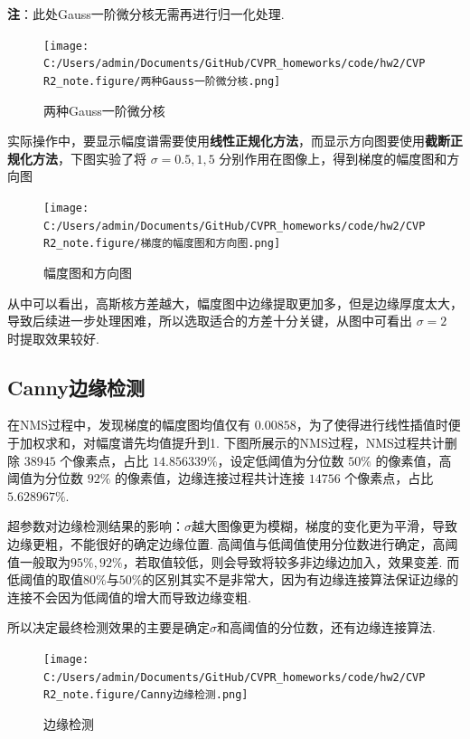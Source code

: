 \documentclass[12pt, a4paper, oneside]{ctexart}
\numberwithin{equation}{section}  %
\begin{document}
\textbf{注}：此处Gauss一阶微分核无需再进行归一化处理.

\begin{figure}[htbp]
    \centering
    \texttt{[image: C:/Users/admin/Documents/GitHub/CVPR\_homeworks/code/hw2/CVPR2\_note.figure/两种Gauss一阶微分核.png]}
    \caption{两种Gauss一阶微分核\label{fig-6}}
\end{figure}

实际操作中，要显示幅度谱需要使用\textbf{线性正规化方法}，而显示方向图要使用\textbf{截断正规化方法}，下图实验了将
\(\sigma=0.5, 1, 5\) 分别作用在图像上，得到梯度的幅度图和方向图

\begin{figure}[htbp]
    \centering
    \hspace*{-1.5cm}
    \texttt{[image: C:/Users/admin/Documents/GitHub/CVPR\_homeworks/code/hw2/CVPR2\_note.figure/梯度的幅度图和方向图.png]}
    \caption{幅度图和方向图\label{fig-7}}
\end{figure}

从中可以看出，高斯核方差越大，幅度图中边缘提取更加多，但是边缘厚度太大，导致后续进一步处理困难，所以选取适合的方差十分关键，从图中可看出
\(\sigma=2\) 时提取效果较好.

\subsection{Canny边缘检测}
在NMS过程中，发现梯度的幅度图均值仅有
\(0.00858\)，为了使得进行线性插值时便于加权求和，对幅度谱先均值提升到1.
下图所展示的NMS过程，NMS过程共计删除 \(38945\) 个像素点，占比
\(14.856339\%\)，设定低阈值为分位数 \(50\%\) 的像素值，高阈值为分位数
\(92\%\) 的像素值，边缘连接过程共计连接 \(14756\) 个像素点，占比
\(5.628967\%\).

超参数对边缘检测结果的影响：$\sigma$越大图像更为模糊，梯度的变化更为平滑，导致边缘更粗，不能很好的确定边缘位置. 高阈值与低阈值使用分位数进行确定，高阈值一般取为$95\%,92\%$，若取值较低，则会导致将较多非边缘边加入，效果变差. 而低阈值的取值$80\%$与$50\%$的区别其实不是非常大，因为有边缘连接算法保证边缘的连接不会因为低阈值的增大而导致边缘变粗.

所以决定最终检测效果的主要是确定$\sigma$和高阈值的分位数，还有边缘连接算法.

\begin{figure}[htbp]
    \centering
    \texttt{[image: C:/Users/admin/Documents/GitHub/CVPR\_homeworks/code/hw2/CVPR2\_note.figure/Canny边缘检测.png]}
    \caption{边缘检测\label{fig-8}}
\end{figure}
\vspace*{-1cm}
\end{document}
